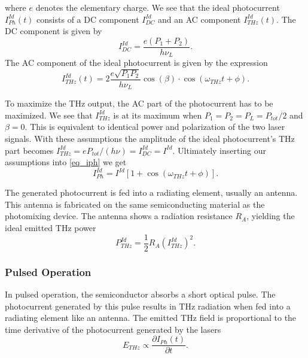 where $e$ denotes the elementary charge.
We see that the ideal photocurrent $I_{Ph}^{Id}(t)$ consists of a DC component $I_{DC}^{Id}$ and an AC component $I_{THz}^{Id}(t)$.
The DC component is given by 
\begin{equation}
	I_{DC}^{Id} = \frac{e(P_1+P_2)}{h\nu_L}.
\end{equation} 
The AC component of the ideal photocurrent is given by the expression
\begin{equation}
	I_{THz}^{Id}(t) = 2\frac{e\sqrt{P_1P_2}}{h\nu_L}\cos(\beta)\cdot\cos(\omega_{THz}t + \phi).
\end{equation}

To maximize the THz output, the AC part of the photocurrent has to be maximized. We see that $I_{THz}^{Id}$ is at its maximum when $P_1 = P_2 = P_L = P_{tot} / 2$ and $\beta = 0$. This is equivalent to identical power and polarization of the two laser signals. With these assumptions the amplitude of the ideal photocurrent's THz part becomes $I_{THz}^{Id} = eP_{tot} / (h\nu) = I_{DC}^{Id} = I^{Id}$. Ultimately inserting our assumptions into \ref{eq_iph} we get 
\begin{equation}
	I_{Ph}^{Id} = I^{Id}[1 + \cos(\omega_{THz}t + \phi)].
	\label{eq8}
\end{equation}

The generated photocurrent is fed into a radiating element, usually an antenna. This antenna is fabricated on the same semiconducting material as the photomixing device. The antenna shows a radiation resistance $R_A$, yielding the ideal emitted THz power 
\begin{equation}
	P_{THz}^{Id}=\frac{1}{2}R_A (I_{THz}^{Id})^2.
	\label{eq_thz_pow}
\end{equation}

\subsubsection{Pulsed Operation}

In pulsed operation, the semiconductor absorbs a short optical pulse. The photocurrent generated by this pulse results in THz radiation when fed into a radiating element like an antenna. The emitted THz field is proportional to the time derivative of the photocurrent generated by the lasers \cite{preuTunableContinuouswaveTerahertz2011}
\begin{equation}
	E_{THz} \propto \frac{\partial I_{Ph}(t)}{\partial t}.
\label{eq1}
\end{equation}

